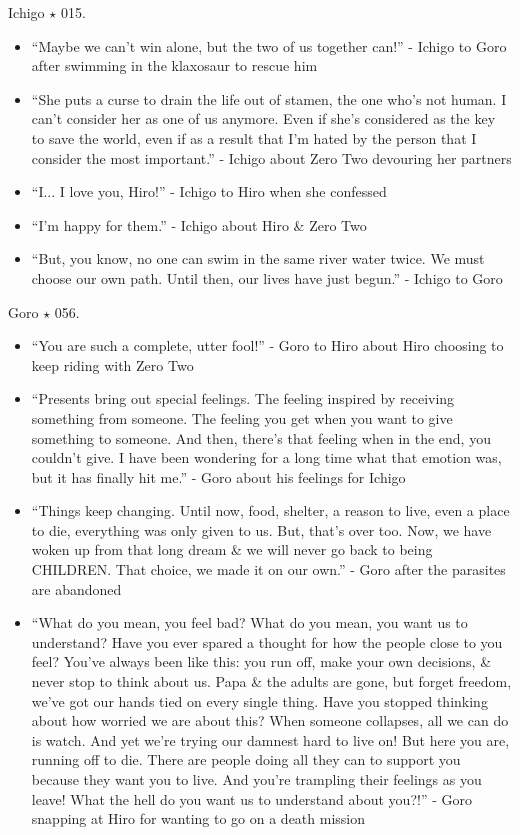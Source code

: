 \documentclass{article}
\begin{document}
\begin{enumerate}
\begin{itemize}
    \end{itemize}
    {\sc Ichigo $\star$ 015.}
    \begin{itemize}
    	\item ``Maybe we can't win alone, but the two of us together can!'' - Ichigo to Goro after swimming in the klaxosaur to rescue him
    	\item ``She puts a curse to drain the life out of stamen, the one who's not human. I can't consider her as one of us anymore. Even if she's considered as the key to save the world, even if as a result that I'm hated by the person that I consider the most important.'' - Ichigo about Zero Two devouring her partners
    	\item ``I... I love you, Hiro!'' - Ichigo to Hiro when she confessed
    	\item ``I'm happy for them.'' - Ichigo about Hiro \& Zero Two
    	\item ``But, you know, no one can swim in the same river water twice. We must choose our own path. Until then, our lives have just begun.'' - Ichigo to Goro
    \end{itemize}
    {\sc Goro $\star$ 056.}
    \begin{itemize}
    	\item ``You are such a complete, utter fool!'' - Goro to Hiro about Hiro choosing to keep riding with Zero Two
    	\item ``Presents bring out special feelings. The feeling inspired by receiving something from someone. The feeling you get when you want to give something to someone. And then, there's that feeling when in the end, you couldn't give. I have been wondering for a long time what that emotion was, but it has finally hit me.'' - Goro about his feelings for Ichigo
    	\item ``Things keep changing. Until now, food, shelter, a reason to live, even a place to die, everything was only given to us. But, that's over too. Now, we have woken up from that long dream \& we will never go back to being CHILDREN. That choice, we made it on our own.'' - Goro after the parasites are abandoned
    	\item ``What do you mean, you feel bad? What do you mean, you want us to understand? Have you ever spared a thought for how the people close to you feel? You've always been like this: you run off, make your own decisions, \& never stop to think about us. Papa \& the adults are gone, but forget freedom, we've got our hands tied on every single thing. Have you stopped thinking about how worried we are about this? When someone collapses, all we can do is watch. And yet we're trying our damnest hard to live on! But here you are, running off to die. There are people doing all they can to support you because they want you to live. And you're trampling their feelings as you leave! What the hell do you want us to understand about you?!'' - Goro snapping at Hiro for wanting to go on a death mission

\end{itemize}
\end{enumerate}
\end{document}
